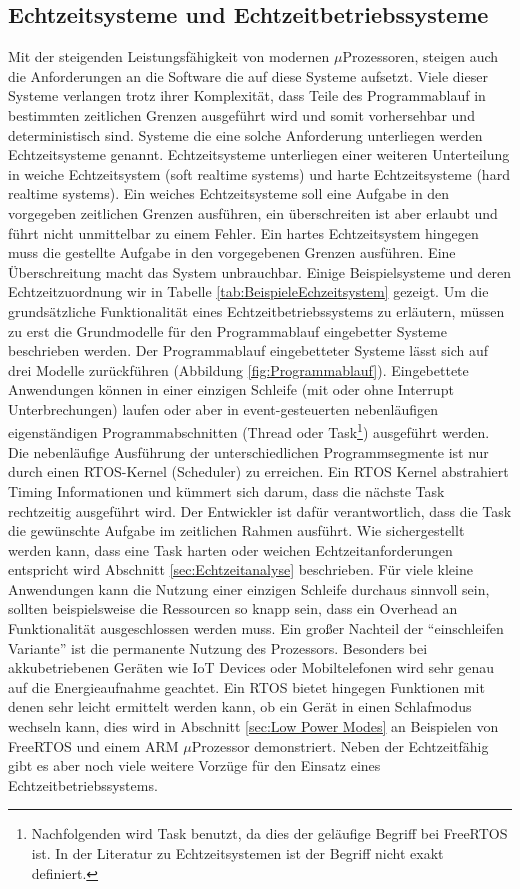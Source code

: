 \subsection{Echtzeitsysteme und Echtzeitbetriebssysteme}
Mit der steigenden Leis\-tungs\-fähig\-keit von modernen $\mu$\-Pro\-zesso\-ren, steigen auch die Anforderungen an die Software die auf diese Systeme aufsetzt. Viele dieser Systeme verlangen trotz ihrer Komplexität, dass Teile des Programmablauf in bestimmten zeitlichen Grenzen ausgeführt wird und somit vorhersehbar und deterministisch sind. Systeme die eine solche Anforderung unterliegen werden Echtzeitsysteme genannt. Echtzeitsysteme unterliegen einer weiteren Unterteilung in weiche Echtzeitsystem (soft realtime systems) und harte Echtzeitsysteme (hard realtime systems). Ein weiches Echtzeitsysteme soll eine Aufgabe in den vorgegeben zeitlichen Grenzen ausführen, ein über\-schreiten ist aber erlaubt und führt nicht unmittelbar zu einem Fehler. Ein hartes Echtzeitsystem hingegen muss die gestellte Aufgabe in den vorgegebenen Grenzen aus\-füh\-ren. Eine Überschreitung macht das System unbrauchbar. Einige Beispielsysteme und deren Echtzeitzuordnung wir in Tabelle \ref{tab:BeispieleEchzeitsystem} gezeigt. Um die grundsätzliche Funktionalität eines Echtzeitbetriebssystems zu erläutern, müssen zu erst die Grundmodelle für den Programmablauf eingebetter Systeme beschrieben werden. Der Programmablauf eingebetteter Systeme lässt sich auf drei Modelle zurückführen (Abbildung \ref{fig:Programmablauf}). Eingebettete Anwendungen können in einer einzigen Schleife (mit oder ohne Interrupt Unterbrechungen) laufen oder aber in event-gesteuerten ne\-ben\-läuf\-igen ei\-gen\-stän\-dig\-en Programmabschnitten (Thre\-ad oder Task\footnote{Nachfolgenden wird Task benutzt, da dies der geläufige Begriff bei FreeRTOS ist. In der Literatur zu Echtzeitsystemen ist der Begriff nicht exakt definiert.}) ausgeführt werden. Die nebenläufige Aus\-füh\-rung der unterschiedlichen Programmsegmente ist nur durch einen RTOS-Kernel (Scheduler) zu erreichen. Ein RTOS Kernel abstrahiert Timing Informationen und küm\-mert sich darum, dass die nächste Task rechtzeitig ausgeführt wird. Der Entwickler ist dafür verantwortlich, dass die Task die gewünschte Aufgabe im zeitlichen Rahmen ausführt. Wie sichergestellt werden kann, dass eine Task  harten oder weichen Echtzeitanforderungen entspricht wird Abschnitt \ref{sec:Echtzeitanalyse} beschrieben. Für viele kleine Anwendungen kann die Nutzung einer einzigen Schleife durchaus sinnvoll sein, sollten beispielsweise die Ressourcen so knapp sein, dass ein Overhead an Funktionalität ausgeschlossen werden muss. Ein großer Nachteil der "`einschleifen Variante"' ist die permanente Nutzung des Prozessors. Besonders bei akkubetriebenen Geräten wie IoT Devices oder Mobiltelefonen wird sehr genau auf die Energieaufnahme geachtet. Ein RTOS bietet hingegen Funktionen mit denen sehr leicht ermittelt werden kann, ob ein Gerät in einen Schlafmodus wechseln kann, dies wird in Abschnitt \ref{sec:Low Power Modes} an Beispielen von FreeRTOS und einem ARM $\mu$Prozessor demonstriert. Neben der Echtzeitfähig gibt es aber noch viele weitere Vorzüge für den Einsatz eines Echtzeitbetriebssystems.  
